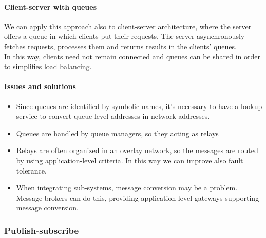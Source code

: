 \paragraph{Client-server with queues}

We can apply this approach also to client-server architecture, where the server offers a queue in which clients put their requests. The server asynchronously fetches requests, processes them and returns results in the clients' queues.\\
In this way, clients need not remain connected and queues can be shared in order to simplifies load balancing.

\paragraph{Issues and solutions}\label{issues-and-solutions}

\begin{itemize}
    \item  Since queues are identified by symbolic names, it's necessary to have a lookup service to convert queue-level addresses in network addresses.
    \item Queues are handled by queue managers, so they acting as relays
    \item Relays are often organized in an overlay network, so the messages are routed by using application-level criteria. In this way we can improve also fault tolerance.
    \item When integrating sub-systems, message conversion may be a problem. Message brokers can do this, providing application-level gateways supporting message conversion.
\end{itemize}

\subsubsection{Publish-subscribe}

